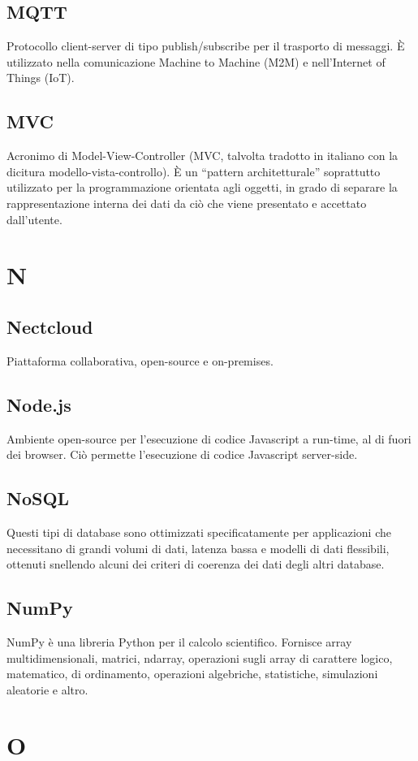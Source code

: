 \subsection{MQTT} Protocollo client-server di tipo publish/subscribe per il trasporto di messaggi. È utilizzato nella comunicazione Machine to Machine (M2M) e nell'Internet of Things (IoT).
\subsection{MVC} Acronimo di Model-View-Controller (MVC, talvolta tradotto in italiano con la dicitura modello-vista-controllo). È un “pattern architetturale”  soprattutto utilizzato per la programmazione orientata agli oggetti, in grado di separare la rappresentazione interna dei dati da ciò che viene presentato e accettato dall'utente.
\newpage \section{N}
\subsection{Nectcloud} Piattaforma collaborativa, open-source e on-premises.
\subsection{Node.js} Ambiente open-source per l'esecuzione di codice Javascript a run-time, al di fuori dei browser. Ciò permette l'esecuzione di codice Javascript server-side.
\subsection{NoSQL} Questi tipi di database sono ottimizzati specificatamente per applicazioni che necessitano di grandi volumi di dati, latenza bassa e modelli di dati flessibili, ottenuti snellendo alcuni dei criteri di coerenza dei dati degli altri database.
\subsection{NumPy} NumPy è una libreria Python per il calcolo scientifico. Fornisce array multidimensionali, matrici, ndarray, operazioni sugli array di carattere logico, matematico, di ordinamento, operazioni algebriche, statistiche, simulazioni aleatorie e altro.
\newpage \section{O}
